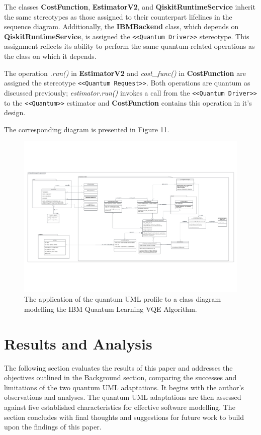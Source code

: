 \documentclass{article}
\begin{document}
The classes \textbf{CostFunction}, \textbf{EstimatorV2}, and \textbf{QiskitRuntimeService} inherit the same stereotypes as those assigned to their counterpart lifelines in the sequence diagram. Additionally, the \textbf{IBMBackend} class, which depends on \textbf{QiskitRuntimeService}, is assigned the \texttt{<<Quantum Driver>>} stereotype. This assignment reflects its ability to perform the same quantum-related operations as the class on which it depends.

The operation \textit{.run()} in \textbf{EstimatorV2} and \textit{cost\_func()} in \textbf{CostFunction} are assigned the stereotype \texttt{<<Quantum Request>>}. Both operations are quantum as discussed previously; \textit{estimator.run()} invokes a call from the \texttt{<<Quantum Driver>>} to the \texttt{<<Quantum>>} estimator and \textbf{CostFunction} contains this operation in it's design.

The corresponding diagram is presented in Figure 11.

\begin{figure}
    \centering
    \includegraphics[width=1\linewidth]{VQE UML Profile CD Final Version.pdf}
    \caption{The application of the quantum UML profile to a class diagram modelling the IBM Quantum Learning VQE Algorithm.}
    \label{fig:QUMLP_CD}
\end{figure}

\section{Results and Analysis}

The following section evaluates the results of this paper and addresses the objectives outlined in the Background section, comparing the successes and limitations of the two quantum UML adaptations. It begins with the author's observations and analyses. The quantum UML adaptations are then assessed against five established characteristics for effective software modelling. The section concludes with final thoughts and suggestions for future work to build upon the findings of this paper.
\end{document}
